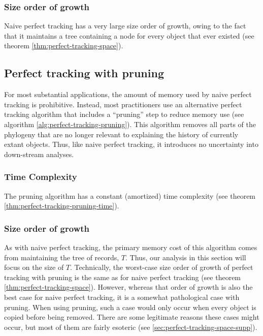 \subsubsection{Size order of growth}

Naive perfect tracking has a very large size order of growth, owing to the fact that it maintains a tree containing a node for every object that ever existed (see theorem \ref{thm:perfect-tracking-space}).



\subsection{Perfect tracking with pruning}

For most substantial applications, the amount of memory used by naive perfect tracking is prohibitive.
Instead, most practitioners use an alternative perfect tracking algorithm that includes a ``pruning'' step to reduce memory use (see algorithm \ref{alg:perfect-tracking-pruning}).
This algorithm removes all parts of the phylogeny that are no longer relevant to explaining the history of currently extant objects.
Thus, like naive perfect tracking, it introduces no uncertainty into down-stream analyses.



\subsubsection{Time Complexity}

The pruning algorithm has a constant (amortized) time complexity (see theorem \ref{thm:perfect-tracking-pruning-time}). 



\subsubsection{Size order of growth}

As with naive perfect tracking, the primary memory cost of this algorithm comes from maintaining the tree of records, $T$.
Thus, our analysis in this section will focus on the size of $T$.
Technically, the worst-case size order of growth of perfect tracking with pruning is the same as for naive perfect tracking (see theorem \ref{thm:perfect-tracking-space}).
However, whereas that order of growth is also the best case for naive perfect tracking, it is a somewhat pathological case with pruning.
When using pruning, such a case would only occur when every object is copied before being removed.
There are some legitimate reasons these cases might occur, but most of them are fairly esoteric (see \ref{sec:perfect-tracking-space-supp}).

